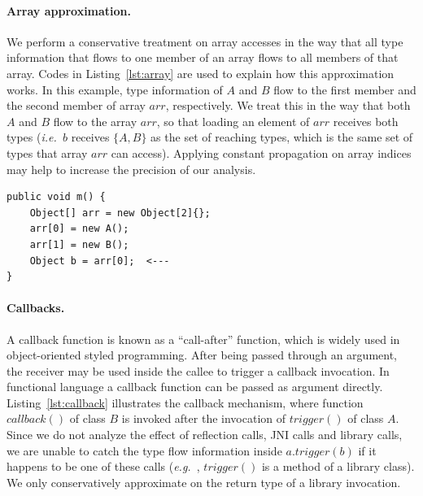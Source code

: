 \documentclass{fac}
\newcommand\eg{\textit{e.g.\ }}
\newcommand\ie{\textit{i.e.\ }}
\begin{document}
\paragraph{Array approximation.} We perform a conservative treatment on array accesses in the way that all type information that flows to one member of an array flows to all members of that array. Codes in Listing~\ref{lst:array} are used to explain how this approximation works. In this example, type information of $A$ and $B$ flow to the first member and the second member of array $arr$, respectively. We treat this in the way that both $A$ and $B$ flow to the array $arr$, so that loading an element of $arr$ receives both types (\ie $b$ receives $\{A, B\}$ as the set of reaching types, which is the same set of types that array $arr$ can access). Applying constant propagation on array indices may help to increase the precision of our analysis.

\begin{lstlisting}[caption={Example code for array accesses},label={lst:array}]
public void m() {
	Object[] arr = new Object[2]{};
	arr[0] = new A();
	arr[1] = new B();
	Object b = arr[0];  <---
}
\end{lstlisting}

\paragraph{Callbacks.} A callback function is known as a ``call-after'' function, which is widely used in object-oriented styled programming. After being passed through an argument, the receiver may be used inside the callee to trigger a callback invocation. In functional language a callback function can be passed as argument directly. Listing~\ref{lst:callback}
illustrates the callback mechanism, where function $callback()$ of class $B$ is invoked after the invocation of $trigger()$ of class $A$. Since we do not analyze the effect of reflection calls, JNI calls and library calls, we are unable to catch the type flow information inside $a.trigger(b)$ if it happens to be one of these calls (\eg, $trigger()$ is a method of a library class). We only conservatively approximate on the return type of a library invocation. %
\end{document}
